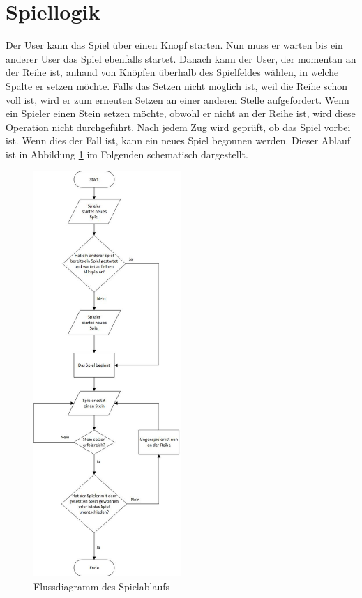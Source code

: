\section{Spiellogik}\label{sec:Spiellogik}
Der User kann das Spiel über einen Knopf starten. Nun muss er warten bis ein anderer User das Spiel ebenfalls startet. Danach kann der User, der momentan an der Reihe ist, anhand von Knöpfen überhalb des Spielfeldes wählen, in welche Spalte er setzen möchte. Falls das Setzen nicht möglich ist, weil die Reihe schon voll ist, wird er zum erneuten Setzen an einer anderen Stelle aufgefordert. Wenn ein Spieler einen Stein setzen möchte, obwohl er nicht an der Reihe ist, wird diese Operation nicht durchgeführt. Nach jedem Zug wird geprüft, ob das Spiel vorbei ist. Wenn dies der Fall ist, kann ein neues Spiel begonnen werden. Dieser Ablauf ist in Abbildung \ref{fig:spiellogik} im Folgenden schematisch dargestellt.
\begin{figure}[H]
\centering
\includegraphics[width=0.5\textwidth]{images/spiellogik.jpg}
\caption{Flussdiagramm des Spielablaufs}
\label{fig:spiellogik}
\end{figure}

